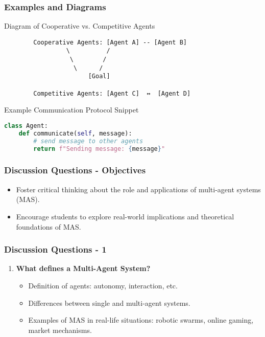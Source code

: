 \documentclass[aspectratio=169]{beamer}
\begin{document}
\begin{frame}[fragile]
    \frametitle{Examples and Diagrams}
    \begin{block}{Diagram of Cooperative vs. Competitive Agents}
        \begin{verbatim}
        Cooperative Agents: [Agent A] -- [Agent B]
                 \          /
                  \        /
                   \      /
                       [Goal]

        Competitive Agents: [Agent C]  ↔  [Agent D]
        \end{verbatim}
    \end{block}
    
    \begin{block}{Example Communication Protocol Snippet}
        \begin{lstlisting}[language=Python]
class Agent:
    def communicate(self, message):
        # send message to other agents
        return f"Sending message: {message}"
        \end{lstlisting}
    \end{block}
\end{frame}

\begin{frame}[fragile]
    \frametitle{Discussion Questions - Objectives}
    \begin{itemize}
        \item Foster critical thinking about the role and applications of multi-agent systems (MAS).
        \item Encourage students to explore real-world implications and theoretical foundations of MAS. 
    \end{itemize}
\end{frame}

\begin{frame}[fragile]
    \frametitle{Discussion Questions - 1}
    \begin{enumerate}
        \item \textbf{What defines a Multi-Agent System?}
            \begin{itemize}
                \item Definition of agents: autonomy, interaction, etc.
                \item Differences between single and multi-agent systems.
                \item Examples of MAS in real-life situations: robotic swarms, online gaming, market mechanisms.
            \end{itemize}
    \end{enumerate}
\end{frame}
\end{document}
